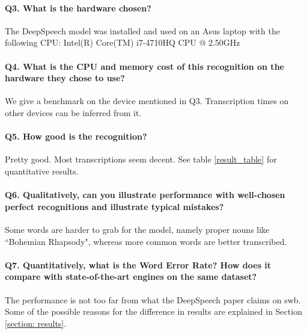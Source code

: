 \documentclass[12pt]{article}
\begin{document}
\paragraph{Q3. What is the hardware chosen?} The DeepSpeech model was installed and used on an Asus laptop with the following CPU: Intel(R) Core(TM) i7-4710HQ CPU @ 2.50GHz

\paragraph{Q4. What is the CPU and memory cost of this recognition on the hardware they chose to use?}
We give a benchmark on the device mentioned in Q3. Transcription times on other devices can be inferred from it.

\paragraph{Q5. How good is the recognition?}
Pretty good. Most transcriptions seem decent. See table \ref{result_table} for quantitative results.

\paragraph{Q6. Qualitatively, can you illustrate performance with well-chosen perfect recognitions and illustrate typical mistakes?}
Some words are harder to grab for the model, namely proper nouns like ``Bohemian Rhapsody", whereas more common words are better transcribed.

\paragraph{Q7. Quantitatively, what is the Word Error Rate? How does it compare with state-of-the-art engines on the same dataset?}
The performance is not too far from what the DeepSpeech paper claims on \gls{swb}. Some of the possible reasons for the difference in results are explained in Section \ref{section: results}.
\end{document}
